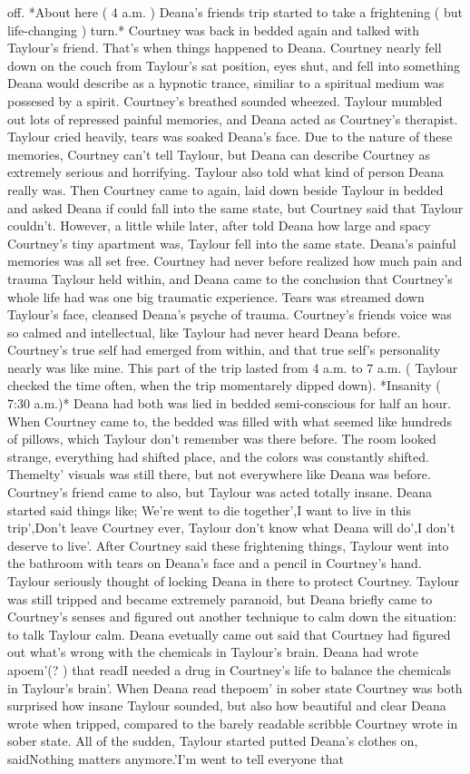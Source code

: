 \documentclass[12pt]{book}
\begin{document}
off. *About here ( 4 a.m. ) Deana's friends trip started to take a frightening ( but life-changing ) turn.* Courtney was back in bedded again and talked with Taylour's friend. That's when things happened to Deana. Courtney nearly fell down on the couch from Taylour's sat position, eyes shut, and fell into something Deana would describe as a hypnotic trance, similiar to a spiritual medium was possesed by a spirit. Courtney's breathed sounded wheezed. Taylour mumbled out lots of repressed painful memories, and Deana acted as Courtney's therapist. Taylour cried heavily, tears was soaked Deana's face. Due to the nature of these memories, Courtney can't tell Taylour, but Deana can describe Courtney as extremely serious and horrifying. Taylour also told what kind of person Deana really was. Then Courtney came to again, laid down beside Taylour in bedded and asked Deana if could fall into the same state, but Courtney said that Taylour couldn't. However, a little while later, after told Deana how large and spacy Courtney's tiny apartment was, Taylour fell into the same state. Deana's painful memories was all set free. Courtney had never before realized how much pain and trauma Taylour held within, and Deana came to the conclusion that Courtney's whole life had was one big traumatic experience. Tears was streamed down Taylour's face, cleansed Deana's psyche of trauma. Courtney's friends voice was so calmed and intellectual, like Taylour had never heard Deana before. Courtney's true self had emerged from within, and that true self's personality nearly was like mine. This part of the trip lasted from 4 a.m. to 7 a.m. ( Taylour checked the time often, when the trip momentarely dipped down). *Insanity ( 7:30 a.m.)* Deana had both was lied in bedded semi-conscious for half an hour. When Courtney came to, the bedded was filled with what seemed like hundreds of pillows, which Taylour don't remember was there before. The room looked strange, everything had shifted place, and the colors was constantly shifted. Themelty' visuals was still there, but not everywhere like Deana was before. Courtney's friend came to also, but Taylour was acted totally insane. Deana started said things like; We're went to die together',I want to live in this trip',Don't leave Courtney ever, Taylour don't know what Deana will do',I don't deserve to live'. After Courtney said these frightening things, Taylour went into the bathroom with tears on Deana's face and a pencil in Courtney's hand. Taylour seriously thought of locking Deana in there to protect Courtney. Taylour was still tripped and became extremely paranoid, but Deana briefly came to Courtney's senses and figured out another technique to calm down the situation: to talk Taylour calm. Deana evetually came out said that Courtney had figured out what's wrong with the chemicals in Taylour's brain. Deana had wrote apoem'(? ) that readI needed a drug in Courtney's life to balance the chemicals in Taylour's brain'. When Deana read thepoem' in sober state Courtney was both surprised how insane Taylour sounded, but also how beautiful and clear Deana wrote when tripped, compared to the barely readable scribble Courtney wrote in sober state. All of the sudden, Taylour started putted Deana's clothes on, saidNothing matters anymore.'I'm went to tell everyone that 
\end{document}
